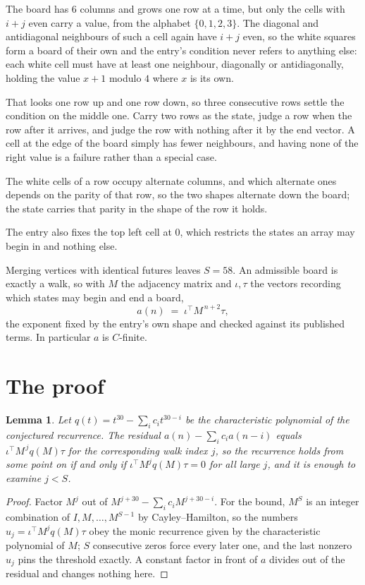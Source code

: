 \documentclass[11pt,a4paper]{article}
\theoremstyle{plain}
\newtheorem{lemma}[theorem]{Lemma}
\theoremstyle{definition}
\begin{document}
The board has $6$ columns and grows one row at a time, but only the cells with $i+j$ even carry a value, from the alphabet $\{0,1,2,3\}$. The diagonal and antidiagonal neighbours of such a cell again have $i+j$ even, so the white squares form a board of their own and the entry's condition never refers to anything else: each white cell must have at least one neighbour, diagonally or antidiagonally, holding the value $x+1$ modulo $4$ where $x$ is its own.

That looks one row up and one row down, so three consecutive rows settle the condition on the middle one. Carry two rows as the state, judge a row when the row after it arrives, and judge the row with nothing after it by the end vector. A cell at the edge of the board simply has fewer neighbours, and having none of the right value is a failure rather than a special case.

The white cells of a row occupy alternate columns, and which alternate ones depends on the parity of that row, so the two shapes alternate down the board; the state carries that parity in the shape of the row it holds.

The entry also fixes the top left cell at $0$, which restricts the states an array may begin in and nothing else.

Merging vertices with identical futures leaves $S=58$. An admissible board is exactly a walk, so with $M$ the adjacency matrix and $\iota,\tau$ the vectors recording which states may begin and end a board,
\[
a(n)\;=\;\iota^{\!\top}M^{\,n+2}\tau ,
\]
the exponent fixed by the entry's own shape and checked against its published terms. In
particular $a$ is $C$-finite.

\section{The proof}

\begin{lemma}\label{lem:crit}
Let $q(t)=t^{30}-\sum_i c_it^{30-i}$ be the characteristic polynomial of the
conjectured recurrence. The residual $a(n)-\sum_ic_ia(n-i)$ equals
$\iota^{\!\top}M^{\,j}q(M)\tau$ for the corresponding walk index $j$, so the recurrence
holds from some point on if and only if $\iota^{\!\top}M^{j}q(M)\tau=0$ for all large $j$,
and it is enough to examine $j<S$.
\end{lemma}

\begin{proof}
Factor $M^{j}$ out of $M^{j+30}-\sum_ic_iM^{j+30-i}$. For the bound, $M^{S}$
is an integer combination of $I,M,\dots,M^{S-1}$ by Cayley--Hamilton, so the numbers
$u_j=\iota^{\!\top}M^{j}q(M)\tau$ obey the monic recurrence given by the characteristic
polynomial of $M$; $S$ consecutive zeros force every later one, and the last nonzero $u_j$
pins the threshold exactly. A constant factor in front of $a$ divides out of the residual and
changes nothing here.
\end{proof}
\end{document}

